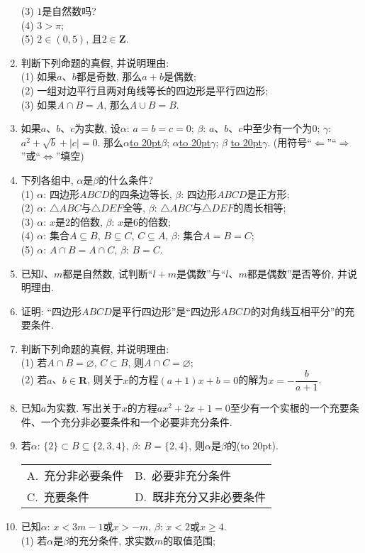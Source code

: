 \documentclass[10pt,a4paper]{article}
\newcommand{\blank}[1]{\underline{\hbox to #1pt{}}}
\newcommand{\bracket}[1]{(\hbox to #1pt{})}
\newcommand{\twoch}[4]{\par\begin{tabular}{p{.46\textwidth}p{.46\textwidth}}
A.~#1& B.~#2\\
C.~#3& D.~#4
\end{tabular}}
\begin{document}
\begin{enumerate}[1.]
(3) $1$是自然数吗?\\
(4) $3>\pi$;\\
(5) $2\in (0, 5)$, 且$2\in \mathbf{Z}$.
\item 判断下列命题的真假, 并说明理由:\\
(1) 如果$a$、$b$都是奇数, 那么$a+b$是偶数;\\
(2) 一组对边平行且两对角线等长的四边形是平行四边形;\\
(3) 如果$A\cap B=A$, 那么$A\cup B=B$.
\item 如果$a$、$b$、$c$为实数, 设$\alpha$: $a=b=c=0$; $\beta$: $a$、$b$、$c$中至少有一个为$0$; $\gamma$: $a^2+\sqrt b+|c|=0$. 那么$\alpha$\blank{20}$\beta$; $\alpha$\blank{20}$\gamma$; $\beta$ \blank{20}$\gamma$. (用符号``$\Leftarrow$''``$\Rightarrow$''或``$\Leftrightarrow$''填空)
\item 下列各组中, $\alpha$是$\beta$的什么条件?\\
(1) $\alpha$: 四边形$ABCD$的四条边等长, $\beta$: 四边形$ABCD$是正方形;\\
(2) $\alpha$: $\triangle ABC$与$\triangle DEF$全等, $\beta$: $\triangle ABC$与$\triangle DEF$的周长相等;\\
(3) $\alpha$: $x$是$2$的倍数, $\beta$: $x$是$6$的倍数;\\
(4) $\alpha$: 集合$A\subseteq B$, $B\subseteq C$, $C\subseteq A$, $\beta$: 集合$A=B=C$;\\
(5) $\alpha$: $A\cap B=A\cap C$, $\beta$: $B=C$.
\item 已知$l$、$m$都是自然数, 试判断``$l+m$是偶数''与``$l$、$m$都是偶数''是否等价, 并说明理由.
\item 证明: ``四边形$ABCD$是平行四边形''是``四边形$ABCD$的对角线互相平分''的充要条件.
\item 判断下列命题的真假, 并说明理由:\\
(1) 若$A\cap B=\varnothing$, $C\subset B$, 则$A\cap C=\varnothing$;\\
(2) 若$a$、$b\in \mathbf{R}$, 则关于$x$的方程$(a+1)x+b=0$的解为$x=- \dfrac b{a+1}$.
\item 已知$a$为实数. 写出关于$x$的方程$ax^2+2x+1=0$至少有一个实根的一个充要条件、一个充分非必要条件和一个必要非充分条件.
\item 若$\alpha$: $\{2\}\subset B\subseteq \{2, 3, 4\}$, $\beta$: $B=\{2, 4\}$, 则$\alpha$是$\beta$的\bracket{20}.
\twoch{充分非必要条件}{必要非充分条件}{充要条件}{既非充分又非必要条件}
\item 已知$\alpha$: $x<3m-1$或$x>-m$, $\beta$: $x<2$或$x\ge 4$.\\
(1) 若$\alpha$是$\beta$的充分条件, 求实数$m$的取值范围;\\

\end{enumerate}
\end{document}
